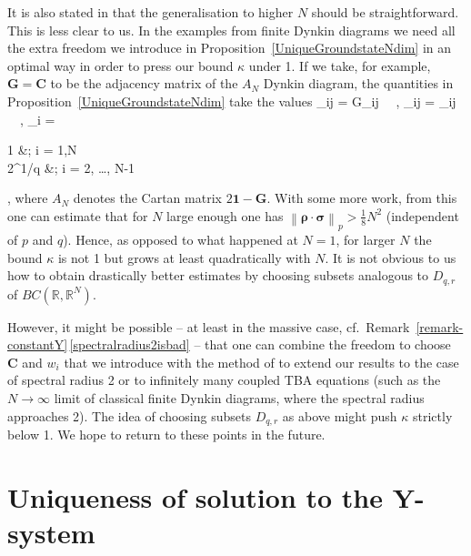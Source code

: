 \documentclass[12pt]{article}
\theoremstyle{plain}
\theoremstyle{definition}
\numberwithin{equation}{section}
\numberwithin{theorem}{section}
\def\be#1\ee{\begin{equation}#1\end{equation}}
\renewcommand{\vec}[1]{\mathbf{#1}}
\begin{document}
It is also stated in \cite{FringKorffSchulz} that the generalisation to higher $N$ should be straightforward. This is less clear to us. In the examples from finite Dynkin diagrams we need all the extra freedom we introduce in Proposition~\ref{UniqueGroundstateNdim} in an optimal way in order to press our bound $\kappa$ under 1. If we take, for example, $\vec G = \vec C$ to be the adjacency matrix of the $A_N$ Dynkin diagram, 
the quantities in Proposition~\ref{UniqueGroundstateNdim} take the values
\be
	M_{ij} = G_{ij} 
	~~,\quad
	\rho_{ij} = \left[(A_N)^{-1}\right]_{ij}
	~~,\quad
	\sigma_i = 
	\begin{cases} 1 &; i = 1,N \\ 2^{1/q} &; i = 2, \dots, N-1 \end{cases}
	\quad ,
\ee
where $A_N$  denotes the Cartan matrix $2 \mathbf{1} - \vec G$. With some more work, from this one can estimate that for $N$ large enough one has
$\left\|\boldsymbol\rho\cdot\boldsymbol\sigma\right\|_p > \tfrac18 N^2$ (independent of $p$ and $q$).
Hence, as opposed to what happened at $N=1$, for larger $N$ the bound $\kappa$ is not 1 but grows 
	at least
quadratically with $N$.
It is not obvious to us how to obtain drastically better estimates by choosing subsets analogous to $D_{q,r}$ of $BC(\mathbb{R},\mathbb{R}^N)$.

However, it might be possible -- at least in the massive case, cf.\ Remark~\ref{remark-constantY}\,\ref{spectralradius2isbad} -- that one can combine the freedom to choose $\vec C$ and $w_i$ that we introduce with the method of \cite{FringKorffSchulz} to extend our results to the case of 
spectral radius 2 or to 
infinitely many coupled TBA equations (such as the $N\to\infty$ limit of classical finite Dynkin diagrams, where the spectral radius approaches 2). The idea of choosing subsets $D_{q,r}$ as above might push $\kappa$ strictly below 1.
We hope to return to these points in the future.



\section{Uniqueness of solution to the Y-system}
\label{section:uniquenessY}
\end{document}
